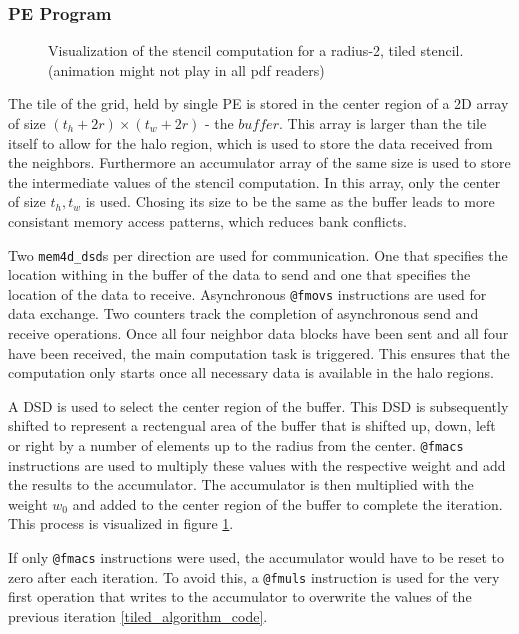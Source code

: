 \documentclass{article}
\begin{document}
\subsubsection{PE Program}

\begin{figure}
    \centering
    \caption{Visualization of the stencil computation for a radius-2, tiled stencil. (animation might not play in all pdf readers)}
    \label{fig:stencil_algorithm_animation}
\end{figure}

The tile of the grid, held by single PE is stored in the center region of a 2D array of size $(t_h+2r)\times (t_w+2r)$ - the $buffer$. This array is larger than the tile itself to allow for the halo region, which is used to store the data received from the neighbors. Furthermore an accumulator array of the same size is used to store the intermediate values of the stencil computation. In this array, only the center of size $t_h, t_w$ is used. Chosing its size to be the same as the buffer leads to more consistant memory access patterns, which reduces bank conflicts.

Two \texttt{mem4d\_dsd}s per direction are used for communication. One that specifies the location withing in the buffer of the data to send and one that specifies the location of the data to receive.
Asynchronous \texttt{@fmovs} instructions are used for data exchange. Two counters track the completion of asynchronous send and receive operations. Once all four neighbor data blocks have been sent and all four have been received, the main computation task is triggered. This ensures that the computation only starts once all necessary data is available in the halo regions.

A DSD is used to select the center region of the buffer. This DSD is subsequently shifted to represent a rectengual area of the buffer that is shifted up, down, left or right by a number of elements up to the radius from the center. \texttt{@fmacs} instructions are used to multiply these values with the respective weight and add the results to the accumulator. The accumulator is then multiplied with the weight $w_0$ and added to the center region of the buffer to complete the iteration. This process is visualized in figure \ref{fig:stencil_algorithm_animation}.

If only \texttt{@fmacs} instructions were used, the accumulator would have to be reset to zero after each iteration. To avoid this, a \texttt{@fmuls} instruction is used for the very first operation that writes to the accumulator to overwrite the values of the previous iteration \ref{tiled_algorithm_code}.
\end{document}
